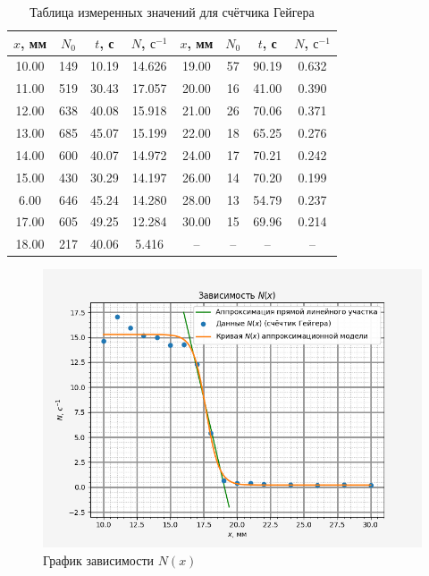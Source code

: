     \begin{table}[h!]
        \centering
        \begin{tabular}{|c|c|c|c|c|c|c|c|}
        \hline
        $x$, мм & $N_0$ & $t$, с & $N$, $\text{с}^{-1}$ & $x$, мм & $N_0$ & $t$, с & $N$, $\text{с}^{-1}$ \\ \hline
        10.00   & 149 & 10.19  & 14.626                 & 19.00   & 57  & 90.19  & 0.632                  \\ \hline
        11.00   & 519 & 30.43  & 17.057                 & 20.00   & 16  & 41.00  & 0.390                  \\ \hline
        12.00   & 638 & 40.08  & 15.918                 & 21.00   & 26  & 70.06  & 0.371                  \\ \hline
        13.00   & 685 & 45.07  & 15.199                 & 22.00   & 18  & 65.25  & 0.276                  \\ \hline
        14.00   & 600 & 40.07  & 14.972                 & 24.00   & 17  & 70.21  & 0.242                  \\ \hline
        15.00   & 430 & 30.29  & 14.197                 & 26.00   & 14  & 70.20  & 0.199                  \\ \hline
        6.00    & 646 & 45.24  & 14.280                 & 28.00   & 13  & 54.79  & 0.237                  \\ \hline
        17.00   & 605 & 49.25  & 12.284                 & 30.00   & 15  & 69.96  & 0.214                  \\ \hline
        18.00   & 217 & 40.06  & 5.416                  & --      & --  & --     & --                     \\ \hline
        \end{tabular}
        \caption{Таблица измеренных значений для счётчика Гейгера}
    \end{table}

    \begin{figure}[h!]
        \centering
        \includegraphics[width = 14 cm]{images/method_1}
        \caption{График зависимости $N(x)$}
        \label{}
    \end{figure}

